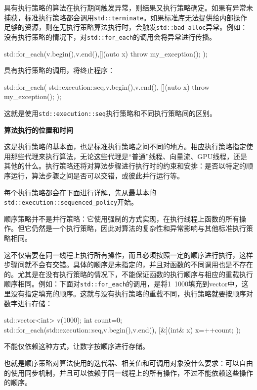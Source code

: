 具有执行策略的算法在执行期间触发异常，则结果又执行策略确定。如果有异常未捕获，标准执行策略都会调用\texttt{std::terminate}。如果标准库无法提供给内部操作足够的资源，则在无执行策略算法执行时，会触发\texttt{std::bad\_alloc}异常。例如：没有执行策略的情况下，对\texttt{std::for\_each}的调用会将异常进行传播。

\begin{cpp}
std::for_each(v.begin(),v.end(),[](auto x){ throw my_exception(); });
\end{cpp}

具有执行策略的调用，将终止程序：

\begin{cpp}
std::for_each(
  std::execution::seq,v.begin(),v.end(),
  [](auto x){ throw my_exception(); });
\end{cpp}

这就是使用\texttt{std::execution::seq}执行策略和不同执行策略间的区别。

\textbf{算法执行的位置和时间}

这是执行策略的基本面，也是标准执行策略之间不同的地方。相应执行策略指定使用那些代理来执行算法，无论这些代理是“普通”线程、向量流、GPU线程，还是其他的什么。执行策略还将对算法步骤进行执行时的约束和安排：是否以特定的顺序运行，算法步骤之间是否可以交错，或彼此并行运行等。

每个执行策略都会在下面进行详解，先从最基本的\texttt{std::execution::sequenced\_policy}开始。


顺序策略并不是并行策略：它使用强制的方式实现，在执行线程上函数的所有操作。但它仍然是一个执行策略，因此对算法的复杂性和异常影响与其他标准执行策略相同。

这不仅需要在同一线程上执行所有操作，而且必须按照一定的顺序进行执行，这样步骤间就不会有交错。具体的顺序是未指定的，并且对函数的不同调用也是不存在的。尤其是在没有执行策略的情况下，不能保证函数的执行顺序与相应的重载执行顺序相同。例如：下面对\texttt{std::for\_each}的调用，是将1~1000填充到vector中，这里没有指定填充的顺序。这就与没有执行策略的重载不同，执行策略就要按顺序对数字进行存储：

\begin{cpp}
std::vector<int> v(1000);
int count=0;
std::for_each(std::execution::seq,v.begin(),v.end(),
  [&](int& x){ x=++count; });
\end{cpp}

不能仅依赖这种方式，让数字按顺序进行存储。

也就是顺序策略对算法使用的迭代器、相关值和可调用对象没什么要求：可以自由的使用同步机制，并且可以依赖于同一线程上的所有操作，不过不能依赖这些操作的顺序。

